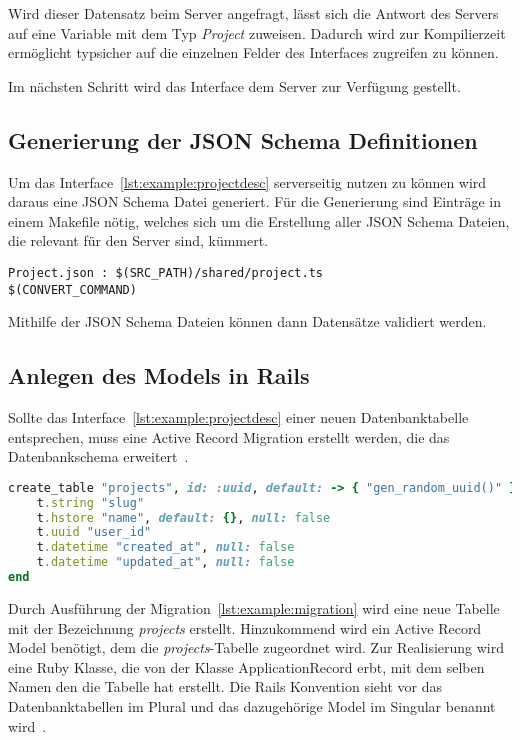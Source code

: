 Wird dieser Datensatz beim Server angefragt, lässt sich die Antwort des Servers auf eine Variable mit dem Typ \emph{Project} zuweisen.
Dadurch wird zur Kompilierzeit ermöglicht typsicher auf die einzelnen Felder des Interfaces zugreifen zu können.

Im nächsten Schritt wird das Interface dem Server zur Verfügung gestellt.

\subsection{Generierung der JSON Schema Definitionen}
\label{sec:requirements:example:schema}
Um das Interface~\ref{lst:example:projectdesc} serverseitig nutzen zu können wird daraus eine JSON Schema Datei generiert.
Für die Generierung sind Einträge in einem Makefile nötig, welches sich um die Erstellung aller JSON Schema Dateien,
die relevant für den Server sind, kümmert.

\begin{lstlisting}[float=h!,caption={TypeScript Interface für die Project Darstellung in einer Liste}, label={lst:example:makefile}]
Project.json : $(SRC_PATH)/shared/project.ts
$(CONVERT_COMMAND)
\end{lstlisting}

Mithilfe der JSON Schema Dateien können dann Datensätze validiert werden.

\subsection{Anlegen des Models in Rails}
\label{sec:requirements:example:model}

Sollte das Interface~\ref{lst:example:projectdesc} einer neuen Datenbanktabelle entsprechen, muss eine Active Record Migration erstellt werden,
die das Datenbankschema erweitert~\cite{rails-migration}.

\begin{lstlisting}[language=Ruby,float=h!,caption={Rails Migration zum hinzufügen einer \emph{projects} Datenbanktabelle}, label={lst:example:migration}]
create_table "projects", id: :uuid, default: -> { "gen_random_uuid()" }, force: :cascade do |t|
	t.string "slug"
	t.hstore "name", default: {}, null: false
	t.uuid "user_id"
	t.datetime "created_at", null: false
	t.datetime "updated_at", null: false
end
\end{lstlisting}

Durch Ausführung der Migration~\ref{lst:example:migration} wird eine neue Tabelle mit der Bezeichnung \emph{projects} erstellt.
Hinzukommend wird ein Active Record Model benötigt, dem die \emph{projects}-Tabelle zugeordnet wird.
Zur Realisierung wird eine Ruby Klasse, die
von der Klasse ApplicationRecord erbt, mit dem selben Namen den die Tabelle hat erstellt.
Die Rails Konvention sieht vor das Datenbanktabellen im Plural und das dazugehörige Model im Singular benannt wird~\cite{rails-naming-convention}.


